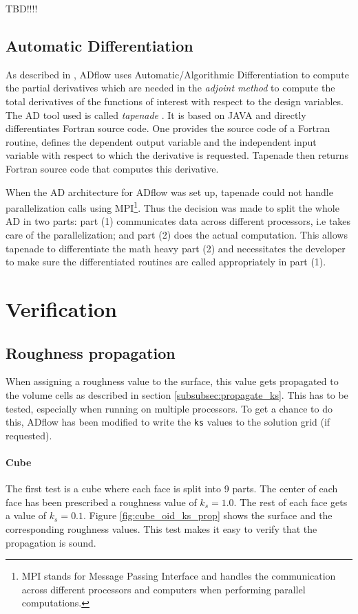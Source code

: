 TBD!!!!

\subsection{Automatic Differentiation}
As described in \cite{cm1}, ADflow uses Automatic/Algorithmic Differentiation to
compute the partial derivatives which are needed in the \textit{adjoint method}
to compute the total derivatives of the functions of interest with respect to
the design variables. The AD tool used is called \textit{tapenade}
\cite{tapenade}. It is based on JAVA and directly differentiates Fortran source
code. One provides the source code of a Fortran routine, defines the dependent
output variable and the independent input variable with respect to which the
derivative is requested. Tapenade then returns Fortran source code that
computes this derivative.

When the AD architecture for ADflow was set up, tapenade could not handle
parallelization calls using MPI\footnote{MPI stands for Message Passing
Interface and handles the communication across different processors and
computers when performing parallel computations.}. Thus the decision was made to
split the whole AD in two parts: part (1) communicates data across different
processors, i.e takes care of the parallelization; and part (2) does the actual
computation. This allows tapenade to differentiate the math heavy part (2) and
necessitates the developer to make sure the differentiated routines are called
appropriately in part (1).


\section{Verification}

\subsection{Roughness propagation}
\label{subsec:roughness_prop}
When assigning a roughness value to the surface, this value gets propagated to
the volume cells as described in section \ref{subsubsec:propagate_ks}. This has
to be tested, especially when running on multiple processors. To get a chance to
do this, ADflow has been modified to write the \texttt{ks} values to the
solution grid (if requested).

\paragraph{Cube}
The first test is a cube where each face is split into 9 parts. The center of
each face has been prescribed a roughness value of $k_{s} = 1.0$. The rest of
each face gets a value of $k_{s} = 0.1$. Figure \ref{fig:cube_oid_ks_prop} shows
the surface and the corresponding roughness values. This test makes it easy to
verify that the propagation is sound.

